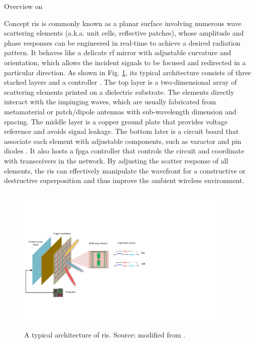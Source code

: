 \begin{section}{Overview on }
	\begin{subsection}{Concept}
		\gls{ris} is commonly known as a planar surface involving numerous wave scattering elements (a.k.a. unit cells, reflective patches), whose amplitude and phase responses can be engineered in real-time to achieve a desired radiation pattern.
		It behaves like a delicate \gls{rf} mirror with adjustable curvature and orientation, which allows the incident signals to be focused and redirected in a particular direction.
		As shown in Fig. \ref{fg:ris_architecture}, its typical architecture consists of three stacked layers and a controller \cite{Wu2020}.
		The top layer is a two-dimensional array of scattering elements printed on a dielectric substrate.
		The elements directly interact with the impinging waves, which are usually fabricated from metamaterial or patch/dipole antennas with sub-wavelength dimension and spacing.
		The middle layer is a copper ground plate that provides voltage reference and avoids signal leakage.
		The bottom later is a circuit board that associate each element with adjustable components, such as varactor and \gls{pin} diodes \cite{Dai2020}.
		It also hosts a \gls{fpga} controller that controls the circuit and coordinate with transceivers in the network.
		By adjusting the scatter response of all elements, the \gls{ris} can effectively manipulate the wavefront for a constructive or destructive superposition and thus improve the ambient wireless environment.
		\begin{figure}
			\centering
			\includegraphics[width=0.9\textwidth]{ris_architecture.pdf}
			\caption{A typical architecture of \gls{ris}. Source: modified from \cite{Wu2020}.}
			\label{fg:ris_architecture}
		\end{figure}
	\end{subsection}


\end{section}
